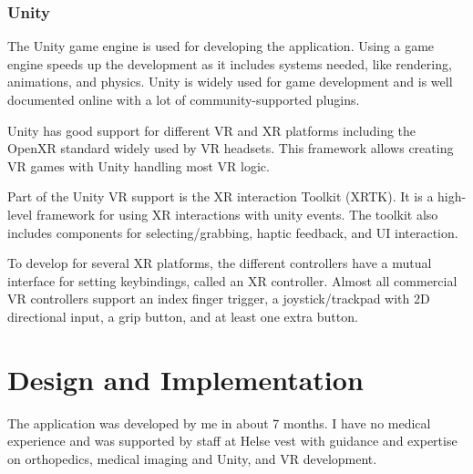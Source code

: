 \documentclass[a4paper]{report}
\begin{document}



\subsection{Unity}

The Unity game engine is used for developing the application\cite{unity}. Using a game engine speeds up the development as it includes systems needed, like rendering, animations, and physics. Unity is widely used for game development\cite{gameenginesonsteam} and is well documented online with a lot of community-supported plugins.

Unity has good support for different VR and XR platforms\cite{unityxr} including the OpenXR standard widely used by VR headsets\cite{openxr}. This framework allows creating VR games with Unity handling most VR logic.

Part of the Unity VR support is the XR interaction Toolkit (XRTK)\cite{xrinteractiontoolkit}. It is a high-level framework for using XR interactions with unity events. The toolkit also includes components for selecting/grabbing, haptic feedback, and UI interaction.

To develop for several XR platforms, the different controllers have a mutual interface for setting keybindings, called an XR controller. Almost all commercial VR controllers support an index finger trigger, a joystick/trackpad with 2D directional input, a grip button, and at least one extra button\cite{technologies_unity_nodate}.



\chapter{Design and Implementation}\label{Design and Implementation}
The application was developed by me in about 7 months. I have no medical experience and was supported by staff at Helse vest with guidance and expertise on orthopedics, medical imaging and Unity, and VR development.
\end{document}
